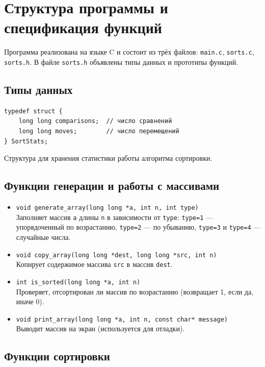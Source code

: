 \documentclass[a4paper,12pt,titlepage,finall]{article}
\begin{document}
\newpage

\section{Структура программы и спецификация функций}

Программа реализована на языке C и состоит из трёх файлов: \texttt{main.c}, \texttt{sorts.c}, \texttt{sorts.h}. В файле \texttt{sorts.h} объявлены типы данных и прототипы функций.

\subsection{Типы данных}

\begin{verbatim}
typedef struct {
    long long comparisons;  // число сравнений
    long long moves;        // число перемещений
} SortStats;
\end{verbatim}
Структура для хранения статистики работы алгоритма сортировки.

\subsection{Функции генерации и работы с массивами}

\begin{itemize}
    \item \texttt{void generate\_array(long long *a, int n, int type)} \\
        Заполняет массив \texttt{a} длины \texttt{n} в зависимости от \texttt{type}: 
        \texttt{type=1} — упорядоченный по возрастанию, \texttt{type=2} — по убыванию, 
        \texttt{type=3} и \texttt{type=4} — случайные числа.
    \item \texttt{void copy\_array(long long *dest, long long *src, int n)} \\
        Копирует содержимое массива \texttt{src} в массив \texttt{dest}.
    \item \texttt{int is\_sorted(long long *a, int n)} \\
        Проверяет, отсортирован ли массив по возрастанию (возвращает 1, если да, иначе 0).
    \item \texttt{void print\_array(long long *a, int n, const char* message)} \\
        Выводит массив на экран (используется для отладки).
\end{itemize}

\subsection{Функции сортировки}
\end{document}
